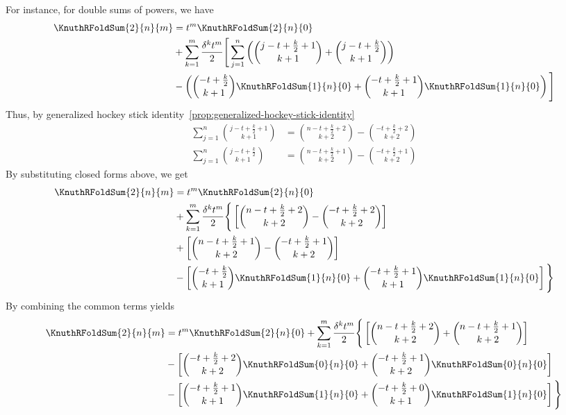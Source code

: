 For instance, for double sums of powers, we have
\begin{align*}
  \KnuthRFoldSum{2}{n}{m}
  &=  t^m \KnuthRFoldSum{2}{n}{0} \\
  &+ \sum_{k=1}^{m} \frac{\delta^{k} t^m}{2}
  \Bigg[
    \sum_{j=1}^{n}
    \left( \binom{j-t+\frac{k}{2}+1}{k+1} + \binom{j-t+\frac{k}{2}}{k+1}
    \right) \\
    &-
    \left(
      \binom{-t+\frac{k}{2}}{k+1} \KnuthRFoldSum{1}{n}{0}
      + \binom{-t+\frac{k}{2}+1}{k+1} \KnuthRFoldSum{1}{n}{0}
    \right)
  \Bigg]
\end{align*}
Thus, by generalized hockey stick
identity~\eqref{prop:generalized-hockey-stick-identity}
\begin{align*}
  \sum_{j=1}^{n} \binom{j-t+\frac{k}{2}+1}{k+1}
  &= \binom{n-t+\frac{k}{2} + 2}{k+2} - \binom{-t+\frac{k}{2}+2}{k+2} \\
  \sum_{j=1}^{n} \binom{j-t+\frac{k}{2}}{k+1}
  &= \binom{n-t+\frac{k}{2} + 1}{k+2} - \binom{-t+\frac{k}{2}+1}{k+2}
\end{align*}
By substituting closed forms above, we get
\begin{align*}
  \KnuthRFoldSum{2}{n}{m}
  &=  t^m \KnuthRFoldSum{2}{n}{0} \\
  &+ \sum_{k=1}^{m} \frac{\delta^{k} t^m}{2}
  \Bigg \{
    \left[
      \binom{n-t+\frac{k}{2} + 2}{k+2} - \binom{-t+\frac{k}{2}+2}{k+2}
    \right] \\
    &+
    \left[ \binom{n-t+\frac{k}{2} + 1}{k+2} - \binom{-t+\frac{k}{2}+1}{k+2}
    \right] \\
    &-
    \left[
      \binom{-t+\frac{k}{2}}{k+1} \KnuthRFoldSum{1}{n}{0}
      + \binom{-t+\frac{k}{2}+1}{k+1} \KnuthRFoldSum{1}{n}{0}
    \right]
  \Bigg \}
\end{align*}
By combining the common terms yields
\begin{align*}
  \KnuthRFoldSum{2}{n}{m}
  &=  t^m \KnuthRFoldSum{2}{n}{0}
  + \sum_{k=1}^{m} \frac{\delta^{k} t^m}{2}
  \Bigg \{
    \left[
      \binom{n-t+\frac{k}{2} + 2}{k+2}
      +
      \binom{n-t+\frac{k}{2} + 1}{k+2}
    \right] \\
    &-
    \left[
      \binom{-t+\frac{k}{2}+2}{k+2} \KnuthRFoldSum{0}{n}{0}
      +
      \binom{-t+\frac{k}{2} + 1}{k+2} \KnuthRFoldSum{0}{n}{0}
    \right] \\
    &-
    \left[
      \binom{-t+\frac{k}{2}+1}{k+1} \KnuthRFoldSum{1}{n}{0}
      +
      \binom{-t+\frac{k}{2}+0}{k+1} \KnuthRFoldSum{1}{n}{0}
    \right]
  \Bigg \}
\end{align*}

